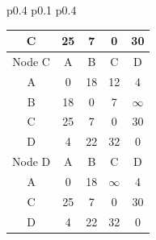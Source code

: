 \documentclass{article}
\begin{document}
\begin{tabular}{p{0.4\linewidth} p{0.1\linewidth} p{0.4\linewidth}}
\begin{tabular}{c|c|c|c|c}
        C & 25 & 7 & 0 & 30 \\
        \hline
        \hline
        Node C & A & B & C & D \\
        \hline
        A & 0 & 18 & 12 & 4 \\
        B & 18 & 0 & 7 & $\infty$ \\
        C & 25 & 7 & 0 & \color{red}30 \\
        D & 4 & 22 & 32 & 0 \\
        \hline
        \hline
        Node D & A & B & C & D \\
        \hline
        A & 0 & 18 & $\infty$ & 4 \\
        C & 25 & 7 & 0 & 30 \\
        D & 4 & 22 & 32 & 0 \\
        \hline
    \end{tabular}
\end{tabular} \\ \\
\end{document}

